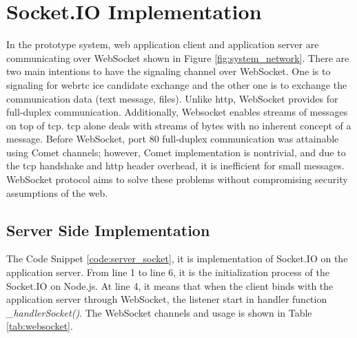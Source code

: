 \section{Socket.IO Implementation}

\noindent In the prototype system, web application client and application server are communicating over WebSocket shown in Figure \ref{fig:system_network}. There are two main intentions to have the signaling channel over WebSocket. One is to signaling for \gls{webrtc} \gls{ice} candidate exchange and the other one is to exchange the communication data (text message, files). Unlike \gls{http}, WebSocket provides for full-duplex communication. Additionally, Websocket enables streams of messages on top of \gls{tcp}. \gls{tcp} alone deals with streams of bytes with no inherent concept of a message. Before WebSocket, port 80 full-duplex communication was attainable using Comet channels; however, Comet implementation is nontrivial, and due to the \gls{tcp} handshake and \gls{http} header overhead, it is inefficient for small messages. WebSocket protocol aims to solve these problems without compromising security assumptions of the web.\cite{wiki:websocket}

\subsection{Server Side Implementation}

\par The Code Snippet \ref{code:server_socket}, it is implementation of Socket.IO on the application server. From line 1 to line 6, it is the initialization process of the Socket.IO on Node.js. At line 4, it means that when the client binds with the application server through WebSocket, the listener start in handler function \textit{\_handlerSocket()}. The WebSocket channels and usage is shown in Table \ref{tab:websocket}.


